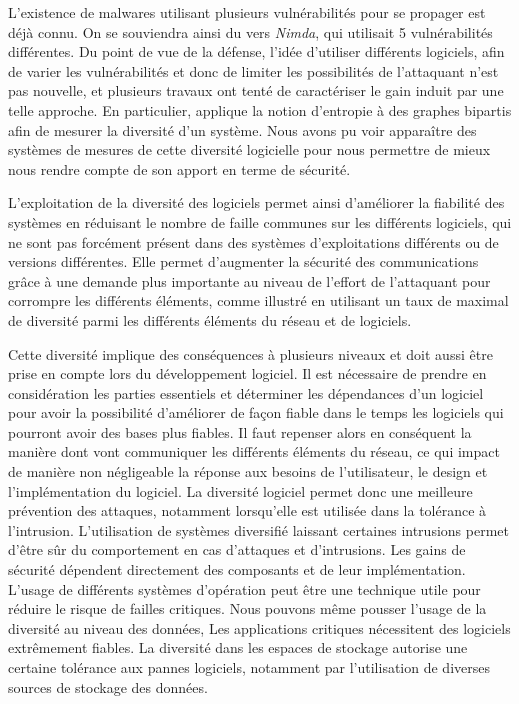 L'existence de malwares utilisant plusieurs vulnérabilités pour se propager est déjà connu. On se souviendra ainsi du
vers \textit{Nimda}, qui utilisait 5 vulnérabilités différentes. Du point de vue de la défense, l'idée d'utiliser différents
logiciels, afin de varier les vulnérabilités et donc de limiter les possibilités de l'attaquant n'est pas nouvelle, et plusieurs
travaux ont tenté de caractériser le gain induit par une telle approche. En particulier, \cite{softwareDiversity:Security}
applique la notion d'entropie à des graphes bipartis afin de mesurer la diversité d'un système. Nous avons pu voir apparaître des systèmes de mesures de cette diversité logicielle \cite{softwareDiversityMetrics} pour nous permettre de mieux nous rendre compte de son apport en terme de sécurité.

L'exploitation de la diversité des logiciels permet ainsi d'améliorer la fiabilité des systèmes en réduisant le nombre de faille communes sur les différents logiciels, qui ne sont pas forcément présent dans des systèmes d'exploitations différents ou de versions différentes.\cite{softwareDiversityPracticalStatistics}
Elle permet d'augmenter la sécurité des communications grâce à une demande plus importante au niveau de l'effort de l'attaquant pour corrompre les différents éléments, comme illustré en utilisant un taux de maximal de diversité parmi les différents éléments du réseau et de logiciels\cite{maximalRatio}. 

Cette diversité implique des conséquences à plusieurs niveaux et doit aussi être prise en compte lors du développement logiciel\cite{processDiversity}. Il est nécessaire de prendre en considération les parties essentiels et déterminer les dépendances d'un logiciel pour avoir la possibilité d'améliorer de façon fiable dans le temps les logiciels qui pourront avoir des bases plus fiables. Il faut repenser alors en conséquent la manière dont vont communiquer les différents éléments du réseau, ce qui impact de manière non négligeable la réponse aux besoins de l'utilisateur, le design et l'implémentation du logiciel.
La diversité logiciel permet donc une meilleure prévention des attaques, notamment lorsqu'elle est utilisée dans la tolérance à l'intrusion\cite{osDiversity}. L'utilisation de systèmes diversifié laissant certaines intrusions permet d’être sûr du comportement en cas d’attaques et d’intrusions. Les gains de sécurité dépendent directement des composants et de leur implémentation. L'usage de différents systèmes d'opération peut être une technique utile pour réduire le risque de failles critiques. 
Nous pouvons même pousser l'usage de la diversité au niveau des données, Les applications critiques nécessitent des logiciels extrêmement fiables.  La diversité dans les espaces de stockage autorise une certaine tolérance aux pannes logiciels\cite{dataDiversity}, notamment par l'utilisation de diverses sources de stockage des données.


